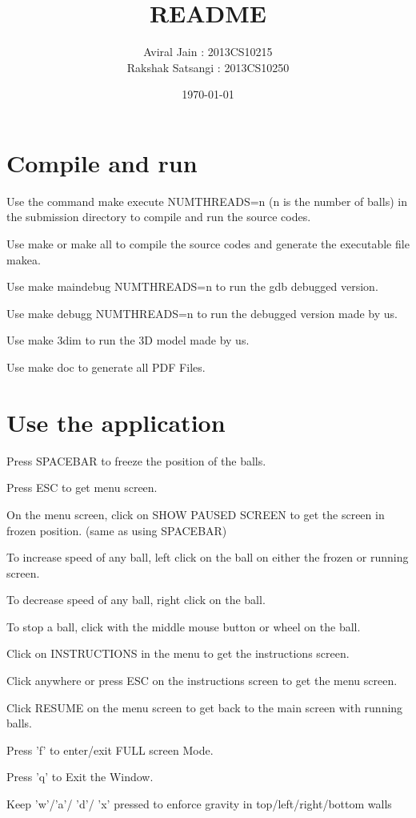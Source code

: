 \documentclass[10pt]{article}
\begin{document}
\title{README}
\author{Aviral Jain : 2013CS10215\\Rakshak Satsangi : 2013CS10250\\
}
\date{\today}
\maketitle

	\section{Compile and run}
		Use the command make execute NUMTHREADS=n (n is the number of balls) in the submission directory to compile and run the source codes.
		
		Use make or make all to compile the source codes and generate the executable file makea.
		
		Use make maindebug NUMTHREADS=n to run the gdb debugged version.
		
		Use make debugg NUMTHREADS=n to run the debugged version made by us.
		
		Use make 3dim to run the 3D model made by us.
		
		Use make doc to generate all PDF Files.



	\section{Use the application}
		Press SPACEBAR to freeze the position of the balls.
		
Press ESC to get menu screen.

On the menu screen, click on SHOW PAUSED SCREEN to get the screen in
frozen position. (same as using SPACEBAR)

To increase speed of any ball, left click on the ball on either the frozen or running screen.

To decrease speed of any ball, right click on the ball.

To stop a ball, click with the middle mouse button or wheel on the ball.

Click on INSTRUCTIONS in the menu to get the instructions screen.

Click anywhere or press ESC on the instructions screen to get the menu screen.

Click RESUME on the menu screen to get back to the main screen with running
balls.

Press 'f' to enter/exit FULL screen Mode.

Press 'q' to Exit the Window.

Keep 'w'/'a'/ 'd'/ 'x' pressed to enforce gravity in top/left/right/bottom walls
	
\end{document}

